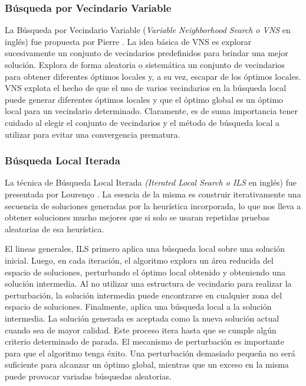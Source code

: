 \subsubsection{Búsqueda por Vecindario Variable}
La Búsqueda por Vecindario Variable (\textit{Variable Neighborhood Search o VNS} en inglés) fue propuesta por Pierre \cite{HansenMladenovic}. La idea básica de VNS es explorar sucesivamente un conjunto de vecindarios predefinidos para brindar una mejor solución. Explora de forma aleatoria o sistemática un conjunto de vecindarios para obtener diferentes óptimos locales y, a su vez, escapar de los óptimos locales. VNS explota el hecho de que el uso de varios vecindarios en la búsqueda local puede generar diferentes óptimos locales y que el óptimo global es un óptimo local para un vecindario determinado. Claramente, es de suma importancia tener cuidado al elegir el conjunto de vecindarios y el método de búsqueda local a utilizar para evitar una convergencia prematura.


\subsubsection{Búsqueda Local Iterada}

La técnica de Búsqueda Local Iterada \textit{(Iterated Local Search o ILS} en inglés) fue presentada por Lourenço \cite{LourencoStutzle}. La esencia de la misma es construir iterativamente una secuencia de soluciones generadas por la heurística incorporada, lo que nos lleva a obtener soluciones mucho mejores que si solo se usaran repetidas pruebas aleatorias de esa heurística.

El lineas generales, ILS primero aplica una búsqueda local sobre una solución inicial. Luego, en cada iteración, el algoritmo explora un área reducida del espacio de soluciones, perturbando el óptimo local obtenido y obteniendo una solución intermedia. Al no utilizar una estructura de vecindario para realizar la perturbación, la solución intermedia puede encontrarse en cualquier zona del espacio de soluciones. Finalmente, aplica una búsqueda local a la solución intermedia. La solución generada es aceptada como la nueva solución actual cuando sea de mayor calidad. Este proceso itera hasta que se cumple algún criterio determinado de parada. El mecanismo de perturbación es importante para que el algoritmo tenga éxito. Una perturbación demasiado pequeña no será suficiente para alcanzar un óptimo global, mientras que un exceso en la misma puede provocar variadas búsquedas aleatorias. 


